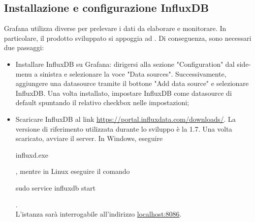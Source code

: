 \subsection{Installazione e configurazione InfluxDB}
Grafana utilizza diverse  per prelevare i dati da elaborare e monitorare. In particolare, il prodotto sviluppato si appoggia ad .
Di conseguenza, sono necessari due passaggi:
\begin{itemize}
	\item{Installare InfluxDB su Grafana:  dirigersi alla sezione "Configuration" dal side-menu a sinistra e selezionare la voce "Data sources". Successivamente, aggiungere una datasource tramite il bottone "Add data source" e selezionare InfluxDB. Una volta installato, impostare InfluxDB come datasource di default spuntando il relativo checkbox nelle impostazioni;}
	\item{Scaricare InfluxDB al link \url{https://portal.influxdata.com/downloads/}. La versione di riferimento utilizzata durante lo sviluppo è la 1.7. Una volta scaricato, avviare il server. In Windows, eseguire \begin{ttfamily}influxd.exe\end{ttfamily}}, mentre in Linux eseguire il comando \begin{ttfamily}sudo service influxdb start\end{ttfamily}.\\
	L'istanza sarà interrogabile all'indirizzo \url{localhost:8086}.
\end{itemize}

\pagebreak